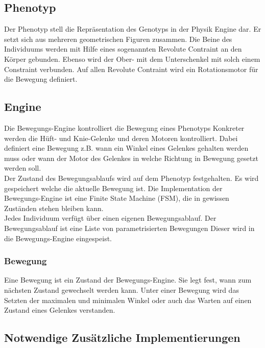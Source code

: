   \subsection{Phenotyp\label{sub:Phenotyp}}

    Der Phenotyp stell die Repräsentation des Genotyps in der Physik Engine dar.
    Er setzt sich aus mehreren geometrischen Figuren zusammen. Die Beine des Individuums
    werden mit Hilfe eines sogenannten Revolute Contraint an den Körper gebunden.
    Ebenso wird der Ober- mit dem Unterschenkel mit solch einem Constraint verbunden.
    Auf allen Revolute Contraint wird ein Rotationsmotor für die Bewegung definiert.

  \subsection{Engine\label{sub:Engine}}

    Die Bewegungs-Engine kontrolliert die Bewegung eines Phenotyps
    Konkreter werden die Hüft- und Knie-Gelenke und deren Motoren kontrolliert.
    Dabei definiert eine Bewegung z.B. wann ein Winkel eines Gelenkes gehalten werden muss
    oder wann der Motor des Gelenkes in welche Richtung in Bewegung gesetzt werden soll.
    \\
    Der Zustand des Bewegungsablaufs wird auf dem Phenotyp festgehalten.
    Es wird gespeichert welche die aktuelle Bewegung ist.
    Die Implementation der Bewegungs-Engine ist eine Finite State Machine (FSM),
    die in gewissen Zuständen stehen bleiben kann.
    \\
    Jedes Individuum verfügt über einen eigenen Bewegungsablauf.
    Der Bewegungsablauf ist eine Liste von parametrisierten Bewegungen
    Dieser wird in die Bewegungs-Engine eingespeist.


    \subsubsection{Bewegung\label{subsub:EngineMovement}}

      Eine Bewegung ist ein Zustand der Bewegungs-Engine.
      Sie legt fest, wann zum nächsten Zustand gewechselt werden kann.
      Unter einer Bewegung wird das Setzten der maximalen und minimalen Winkel oder auch
      das Warten auf einen Zustand eines Gelenkes verstanden.

  \subsection{Notwendige Zusätzliche Implementierungen}

